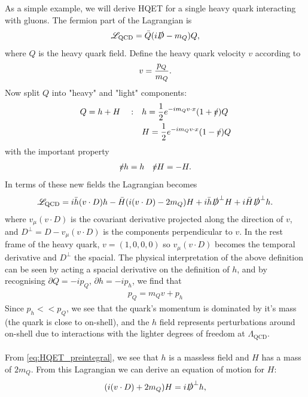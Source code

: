 As a simple example, we will derive HQET for a single heavy quark interacting with gluons. The fermion part of the Lagrangian is
\begin{align}
	\mathscr{L}_{\text{QCD}} = \bar{Q} ( i\slashed{D} - m_Q ) Q,
	\label{eq:dirac}
\end{align}
where $Q$ is the heavy quark field. Define the heavy quark velocity $v$ according to
\begin{align}
	v = {p_Q \over m_Q}.
\end{align}
Now split $Q$ into "heavy" and "light" components:
\begin{align}
	\label{eq:hdef}
	Q = h + H\quad : \quad &h = {1\over 2} e^{-im_Q v\cdot x} ( 1 + \slashed{v} ) Q \\
	&H = {1\over 2} e^{-im_Q v\cdot x} ( 1 - \slashed{v} ) Q
\end{align}
with the important property
\begin{align}
	\slashed{v} h = h \quad \slashed{v} H = - H.
\end{align}
In terms of these new fields the Lagrangian becomes
\begin{align}
	\mathscr{L}_{\text{QCD}} = i\bar{h} (v\cdot D) h - \bar{H} ( i(v\cdot D) - 2m_Q ) H 
		+ i \bar{h} \slashed{D}^{\perp} H + i \bar{H} \slashed{D}^{\perp} h.
		\label{eq:HQET_preintegral}
\end{align}
where $v_{\mu}(v\cdot D)$ is the covariant derivative projected along the direction of $v$, and $D^{\perp} = D - v_{\mu}(v\cdot D)$ is the components perpendicular to $v$. In the rest frame of the heavy quark, $v = (1,0,0,0)$ so $v_{\mu}(v\cdot D)$ becomes the temporal derivative and $D^{\perp}$ the spacial. The physical interpretation of the above definition can be seen by acting a spacial derivative on the definition of $h$, and by recognising $\partial Q = -i p_Q$, $\partial h = -i p_h$, we find that
\begin{align}
	p_Q = m_Q v + p_h
\end{align} 
Since $p_h << p_Q$, we see that the quark's momentum is dominated by it's mass (the quark is close to on-shell), and the $h$ field represents perturbations around on-shell due to interactions with the lighter degrees of freedom at $\Lambda_{\text{QCD}}$.
\\ \\
From \eqref{eq:HQET_preintegral}, we see that $h$ is a massless field and $H$ has a mass of $2m_Q$. From this Lagrangian we can derive an equation of motion for $H$:
\begin{align}
	( i(v\cdot D) + 2m_Q) H = i\slashed{D}^{\perp} h,
\end{align}
